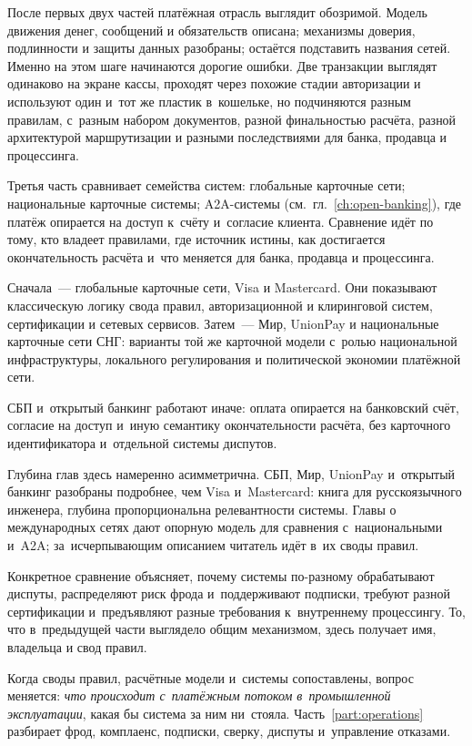 %
После первых двух частей платёжная отрасль выглядит обозримой.
Модель движения денег, сообщений и обязательств описана; механизмы
доверия, подлинности и защиты данных разобраны; остаётся подставить
названия сетей. Именно на этом шаге начинаются дорогие ошибки. Две
транзакции выглядят одинаково на экране кассы, проходят через похожие
стадии авторизации и используют один и~тот же пластик в~кошельке, но
подчиняются разным правилам,
с~разным набором документов, разной финальностью расчёта,
разной архитектурой маршрутизации и разными последствиями для банка,
продавца и процессинга.

Третья часть сравнивает семейства систем: глобальные карточные сети;
национальные карточные системы; A2A-системы
(см.~гл.~\ref{ch:open-banking}), где платёж опирается на доступ к~счёту
и~согласие клиента. Сравнение идёт по тому, кто владеет правилами, где источник
истины, как достигается окончательность расчёта и~что меняется для банка,
продавца и процессинга.

Сначала~--- глобальные карточные сети, Visa и Mastercard. Они показывают
классическую логику свода правил, авторизационной и клиринговой систем,
сертификации и сетевых сервисов. Затем~--- Мир, UnionPay и национальные
карточные сети СНГ: варианты той же карточной модели с~ролью национальной
инфраструктуры, локального регулирования и политической экономии платёжной
сети.

СБП и~открытый банкинг работают иначе: оплата опирается на банковский счёт,
согласие на доступ и~иную семантику окончательности расчёта, без карточного
идентификатора и~отдельной системы диспутов.

Глубина глав здесь намеренно асимметрична. СБП, Мир, UnionPay и~открытый
банкинг разобраны подробнее, чем Visa и~Mastercard: книга для русскоязычного
инженера, глубина пропорциональна релевантности системы. Главы о
международных сетях дают опорную модель для сравнения с~национальными и~A2A;
за~исчерпывающим описанием читатель идёт в~их своды правил.

Конкретное сравнение объясняет, почему системы по-разному обрабатывают
диспуты, распределяют риск фрода и~поддерживают подписки, требуют разной
сертификации и~предъявляют разные требования к~внутреннему процессингу. То, что в~предыдущей части выглядело общим
механизмом, здесь получает имя, владельца и свод правил.

Когда своды правил, расчётные модели и~системы сопоставлены, вопрос
меняется: \emph{что происходит с~платёжным потоком в~промышленной эксплуатации}, какая бы
система за ним ни~стояла. Часть~\ref{part:operations} разбирает фрод,
комплаенс, подписки, сверку, диспуты и~управление отказами.
